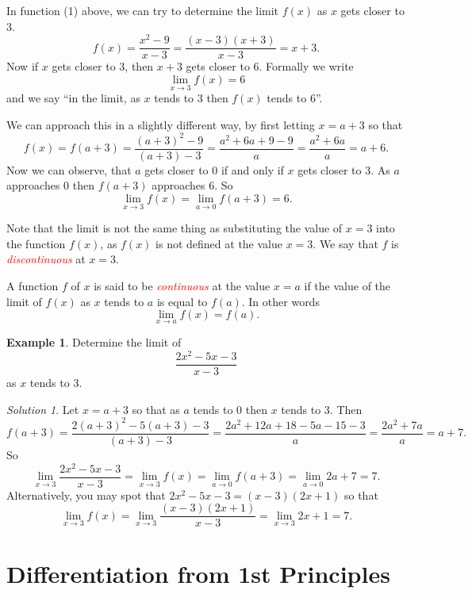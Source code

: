 \documentclass[
  11pt,
  oneside]{book}
\newcommand{\slide}{}
\theoremstyle{definition}
\theoremstyle{definition}
\newtheorem{example}{Example}[chapter]
\theoremstyle{definition}
\theoremstyle{definition}
\theoremstyle{remark}
\newtheorem*{solution}{Solution}
\begin{document}
\slide

In function (1) above, we can try to determine the limit \(f(x)\) as \(x\) gets closer to \(3\).
\[
f(x) = \frac{x^2-9}{x-3} = \frac{(x-3)(x+3)}{x-3} = x+3.
\]
Now if \(x\) gets closer to \(3\), then \(x+3\) gets closer to \(6\). Formally we write
\[
\lim\limits_{x\to3} f(x) = 6
\]
and we say ``in the limit, as \(x\) tends to \(3\) then \(f(x)\) tends to 6''.

\slide

We can approach this in a slightly different way, by first letting \(x = a+3\) so that
\[
f(x) = f(a+3) = \frac{(a+3)^2-9}{(a+3)-3} = \frac{a^2+6a + 9 - 9}{a} = \frac{a^2+6a}{a} = a+6.
\]
Now we can observe, that \(a\) gets closer to \(0\) if and only if \(x\) gets closer to \(3\). As \(a\) approaches \(0\) then \(f(a+3)\) approaches \(6\). So
\[
\lim\limits_{x\to3}f(x) = \lim\limits_{a\to0}f(a+3) = 6.
\]

\slide

Note that the limit is not the same thing as substituting the value of \(x=3\) into the function \(f(x)\), as \(f(x)\) is not defined at the value \(x=3\). We say that \(f\) is \textcolor{red}{\em discontinuous} at \(x=3\).

A function \(f\) of \(x\) is said to be \textcolor{red}{\em continuous} at the value \(x=a\) if the value of the limit of \(f(x)\) as \(x\) tends to \(a\) is equal to \(f(a)\). In other words
\[
\lim\limits_{x\to a}f(x) = f(a).
\]
\slide

\begin{example}
Determine the limit of
\[
\frac{2x^2-5x-3}{x-3}
\]
as \(x\) tends to \(3\).
\end{example}

\begin{solution}
Let \(x = a+3\) so that as \(a\) tends to \(0\) then \(x\) tends to \(3\). Then
\[
f(a+3) = \frac{2(a+3)^2-5(a+3)-3}{(a+3)-3}=\frac{2a^2+12a+18-5a-15-3}{a}=\frac{2a^2+7a}{a} = a+7.
\]
So
\[
\lim\limits_{x\to3}\frac{2x^2-5x-3}{x-3} = \lim\limits_{x\to3}f(x) = \lim\limits_{a\to0}f(a+3) = \lim\limits_{a\to0}2a+7 = 7.
\]
Alternatively, you may spot that \(2x^2-5x-3 = (x-3)(2x+1)\) so that
\[
\lim\limits_{x\to 3}f(x) = \lim\limits_{x\to3}\frac{(x-3)(2x+1)}{x-3} = \lim\limits_{x\to3}2x+1 = 7.
\]
\end{solution}

\section{Differentiation from 1st Principles}\label{lecture-two}
\end{document}
